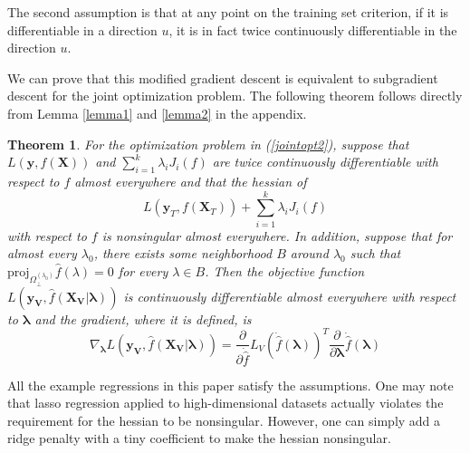 \documentclass[10pt,letterpaper]{article}
\newtheorem{theorem}{Theorem}
\begin{document}
The second assumption is that at any point on the training set criterion, if it is differentiable in a direction $u$, it is in fact twice continuously differentiable in the direction $u$.

We can prove that this modified gradient descent is equivalent to subgradient descent for the joint optimization problem. The following theorem follows directly from Lemma \ref{lemma1} and \ref{lemma2} in the appendix.


\begin{theorem}
For the optimization problem in (\ref{jointopt2}), suppose that $L(\boldsymbol{y}, f(\boldsymbol{X}))$ and
$\sum\limits_{i=1}^k \lambda_i J_i(f)$ are twice continuously differentiable with respect to $f$ almost everywhere and that the hessian of
\begin{equation}
L(\boldsymbol{y}_T, f (\boldsymbol{X}_T)) + \sum\limits_{i=1}^k \lambda_i J_i(f)
\end{equation}
with respect to $f$ is nonsingular almost everywhere. In addition, suppose that for almost every $\lambda_0$, there exists some neighborhood $B$ around $\lambda_0$ such that $\text{proj}_{\Omega_{\bot}^{(\lambda_0)}} \hat f(\lambda)=0$ for every $\lambda \in B$. Then the objective function $L(\boldsymbol{y_V}, \hat f(\boldsymbol{X_V} | \boldsymbol{\lambda}))$ is continuously differentiable almost everywhere with respect to $\boldsymbol{\lambda}$ and the gradient, where it is defined, is
\begin{equation}
\nabla_{\boldsymbol{\lambda}} L(\boldsymbol{y_V}, \hat f(\boldsymbol{X_V} | \boldsymbol{\lambda})) = \frac{\partial}{\partial \dot{\hat{f}}} L_V(\dot{\hat{f}}(\boldsymbol{\lambda}))^T \frac{\partial}{\partial \boldsymbol{\lambda}} \dot{\hat{f}}(\boldsymbol{\lambda})
\end{equation}

\label{thethrm}
\end{theorem}

All the example regressions in this paper satisfy the assumptions. One may note that lasso regression applied to high-dimensional datasets actually violates the requirement for the hessian to be nonsingular. However, one can simply add a ridge penalty with a tiny coefficient to make the hessian nonsingular.
\end{document}
